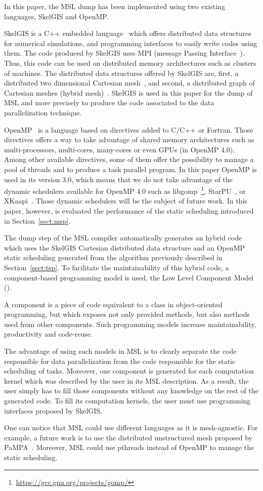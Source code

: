 In this paper, the MSL dump has been implemented using two existing languages, SkelGIS and OpenMP.

SkelGIS is a C++ embedded language~\cite{CPE:CPE3494} which offers distributed data structures for numerical simulations, and programming interfaces to easily write codes using them. The code produced by SkelGIS uses MPI (message Passing Interface~\cite{Graham2009MSE}). Thus, this code can be used on distributed memory architectures such as clusters of machines. The distributed data structures offered by SkelGIS are, first, a distributed two dimensional Cartesian mesh~\cite{DBLP:conf/ieeehpcs/HeleneS13}, and second, a distributed graph of Cartesian meshes (hybrid mesh)~\cite{DBLP:conf/europar/CoullonL14}. SkelGIS is used in this paper for the dump of MSL and more precisely to produce the code associated to the data parallelization technique.

OpenMP~\cite{660313} is a language based on directives added to C/C++ or Fortran. Those directives offers a way to take advantage of shared memory architectures such as multi-processors, multi-cores, many-cores or even GPUs (in OpenMP 4.0). Among other available directives, some of them offer the possibility to manage a pool of threads and to produce a task parallel program. In this paper OpenMP is used in its version 3.0, which means that we do not take advantage of the dynamic schedulers available for OpenMP 4.0 such as libgomp~\footnote{\url{https://gcc.gnu.org/projects/gomp/}}, StarPU~\cite{Augonnet2011}, or XKaapi~\cite{Gautier:2013:XRS:2510661.2511383}. Those dynamic schedulers will be the subject of future work. In this paper, however, is evaluated the performance of the static scheduling introduced in Section~\ref{sect:msp}.

The dump step of the MSL compiler automatically generates an hybrid code which uses the SkelGIS Cartesian distributed data structure and an OpenMP static scheduling generated from the algorithm previously described in Section~\ref{sect:tsp}. To facilitate the maintainability of this hybrid code, a component-based programming model is used, the Low Level Component Model~\cite{l2c} (\llc). 

A component is a piece of code equivalent to a class in object-oriented programming, but which exposes not only provided methods, but also methods used from other components. Such programming models increase maintainability, productivity and code-reuse.

The advantage of using such models in MSL is to clearly separate the code responsible for data parallelization from the code responsible for the static scheduling of tasks. Moreover, one component is generated for each computation kernel which was described by the user in its MSL description. As a result, the user simply has to fill those components without any knowledge on the rest of the generated code. To fill its computation kernels, the user must use programming interfaces proposed by SkelGIS.

One can notice that MSL could use different languages as it is mesh-agnostic. For example, a future work is to use the distributed unstructured mesh proposed by PaMPA~\cite{lachat:hal-00768916}. Moreover, MSL could use pthreads instead of OpenMP to manage the static scheduling.

